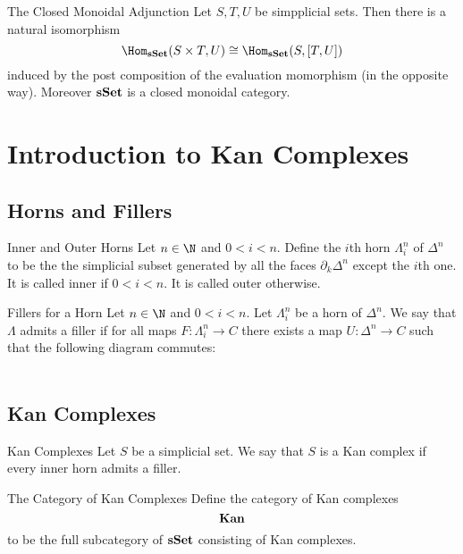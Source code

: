 \documentclass[a4paper]{article}
\begin{document}
\begin{thm}{The Closed Monoidal Adjunction}{} Let $S,T,U$ be simpplicial sets. Then there is a natural isomorphism $$\Hom_\bold{sSet}(S\times T,U)\cong\Hom_\bold{sSet}(S,[T,U])$$ induced by the post composition of the evaluation momorphism (in the opposite way). Moreover $\bold{sSet}$ is a closed monoidal category. 
\end{thm}

\pagebreak
\section{Introduction to Kan Complexes}
\subsection{Horns and Fillers}
\begin{defn}{Inner and Outer Horns}{} Let $n\in\N$ and $0<i<n$. Define the $i$th horn $\Lambda_i^n$ of $\Delta^n$ to be the the simplicial subset generated by all the faces $\partial_k\Delta^n$ except the $i$th one. It is called inner if $0<i<n$. It is called outer otherwise. 
\end{defn}

\begin{defn}{Fillers for a Horn}{} Let $n\in\N$ and $0<i<n$. Let $\Lambda_i^n$ be a horn of $\Delta^n$. We say that $\Lambda$ admits a filler if for all maps $F:\Lambda_i^n\to C$ there exists a map $U:\Delta^n\to C$ such that the following diagram commutes: \\~\\
\end{defn}

\subsection{Kan Complexes}
\begin{defn}{Kan Complexes}{} Let $S$ be a simplicial set. We say that $S$ is a Kan complex if every inner horn admits a filler. 
\end{defn}

\begin{defn}{The Category of Kan Complexes}{} Define the category of Kan complexes $$\bold{Kan}$$ to be the full subcategory of $\bold{sSet}$ consisting of Kan complexes. 
\end{defn}
\end{document}
